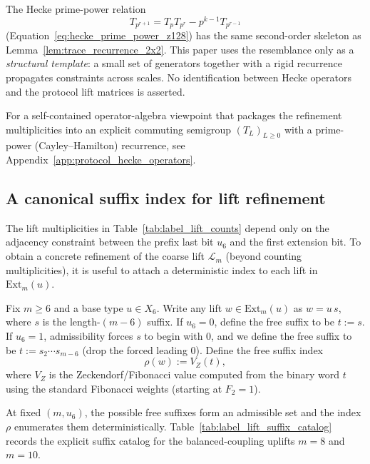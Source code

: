 \begin{remark}\label{rem:hecke_prime_power_structural_analogue}
\AuditTag The Hecke prime-power relation
\[
T_{p^{r+1}} = T_p T_{p^r} - p^{k-1} T_{p^{r-1}}
\]
(Equation~\eqref{eq:hecke_prime_power_z128}) has the same second-order skeleton as Lemma~\ref{lem:trace_recurrence_2x2}.
This paper uses the resemblance only as a \emph{structural template}: a small set of generators together with a rigid recurrence propagates constraints across scales.
No identification between Hecke operators and the protocol lift matrices is asserted.
\end{remark}

\AuditTag For a self-contained operator-algebra viewpoint that packages the refinement multiplicities into an explicit commuting semigroup $(T_L)_{L\ge 0}$ with a prime-power (Cayley--Hamilton) recurrence, see Appendix~\ref{app:protocol_hecke_operators}.

\subsection{A canonical suffix index for lift refinement}
\label{subsec:lift_suffix_index}

The lift multiplicities in Table~\ref{tab:label_lift_counts} depend only on the adjacency constraint between the prefix last bit $u_6$ and the first extension bit.
To obtain a concrete refinement of the coarse lift $\mathcal{L}_m$ (beyond counting multiplicities), it is useful to attach a deterministic index to each lift in $\mathrm{Ext}_m(u)$.

\begin{definition}\label{def:free_suffix_index}
Fix $m\ge 6$ and a base type $u\in X_6$.
Write any lift $w\in \mathrm{Ext}_m(u)$ as $w=u\,s$, where $s$ is the length-$(m-6)$ suffix.
If $u_6=0$, define the free suffix to be $t:=s$.
If $u_6=1$, admissibility forces $s$ to begin with $0$, and we define the free suffix to be $t:=s_2\cdots s_{m-6}$ (drop the forced leading $0$).
Define the free suffix index
\[
\rho(w):=V_Z(t),
\]
where $V_Z$ is the Zeckendorf/Fibonacci value computed from the binary word $t$ using the standard Fibonacci weights (starting at $F_2=1$).
\end{definition}

At fixed $(m,u_6)$, the possible free suffixes form an admissible set and the index $\rho$ enumerates them deterministically.
Table~\ref{tab:label_lift_suffix_catalog} records the explicit suffix catalog for the balanced-coupling uplifts $m=8$ and $m=10$.

